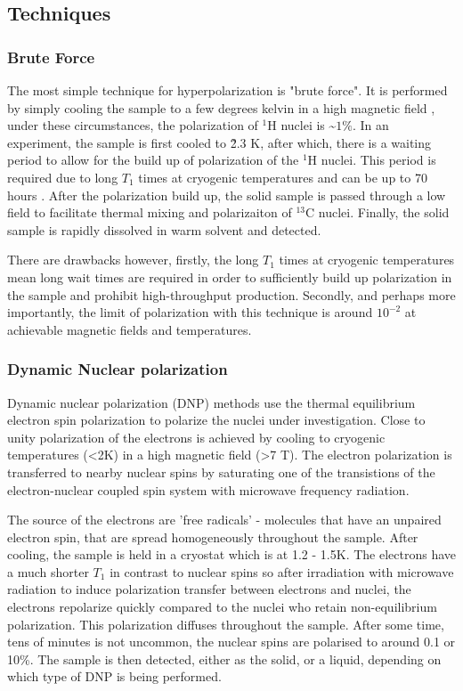 \subsection{Techniques}

 \subsubsection{Brute Force}

 The most simple technique for hyperpolarization is "brute force". It is performed by simply
 cooling the sample to a few degrees kelvin in a high magnetic field \citep{RN155,RN157}, under
 these circumstances, the polarization of $^1$H nuclei is \~$1\%$. In an experiment, the sample
 is first cooled to \~2.3 K, after which, there is a waiting period to allow for the build up of polarization
 of the $^1$H nuclei. This period is required due to long $T_1$ times at cryogenic temperatures and
 can be up to 70 hours \citep{RN155}. After the polarization build up, the solid sample is passed
 through a low field to facilitate thermal mixing and polarizaiton of $^13$C nuclei. Finally,
 the solid sample is rapidly dissolved in warm solvent and detected.

 There are drawbacks however, firstly, the long $T_1$ times at cryogenic temperatures mean long
 wait times are required in order to sufficiently build up polarization in the sample and prohibit high-throughput production.
 Secondly, and perhaps more importantly, the limit of polarization with this technique is around $10^{-2}$ at achievable
 magnetic fields and temperatures.

 \subsubsection{Dynamic Nuclear polarization}

Dynamic nuclear polarization (DNP) methods use the thermal equilibrium electron spin polarization to polarize the nuclei under investigation. Close to unity
polarization of the electrons is achieved by cooling to cryogenic temperatures (<2K) in a high magnetic field (>7 T).
The electron polarization is transferred to nearby nuclear spins by saturating one of the transistions of the electron-nuclear
coupled spin system with microwave frequency radiation.

The source of the electrons are 'free radicals' - molecules that have an unpaired electron spin, that
are spread homogeneously throughout the sample. After cooling, the sample is held in a cryostat which is at
1.2 - 1.5K. The electrons have a much shorter $T_1$ in contrast to nuclear spins so after irradiation with
microwave radiation to induce polarization transfer between electrons and nuclei, the electrons repolarize
quickly compared to the nuclei who retain non-equilibrium polarization. This polarization diffuses throughout the
sample. After some time, tens of minutes is not uncommon, the nuclear spins are polarised to around 0.1 or 10\%. The
sample is then detected, either as the solid, or a liquid, depending on which type of DNP is being performed.

